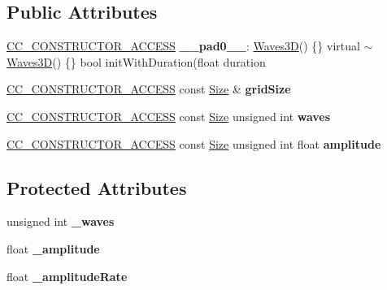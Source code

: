 \subsection*{Public Attributes}
\begin{DoxyCompactItemize}
\item 
\mbox{\label{classWaves3D_adcd03f1972d5d162163016145151eb41}} 
\hyperlink{_2cocos2d_2cocos_2base_2ccConfig_8h_a25ef1314f97c35a2ed3d029b0ead6da0}{C\+C\+\_\+\+C\+O\+N\+S\+T\+R\+U\+C\+T\+O\+R\+\_\+\+A\+C\+C\+E\+SS} {\bfseries \+\_\+\+\_\+pad0\+\_\+\+\_\+}\+: \hyperlink{classWaves3D}{Waves3D}() \{\} virtual $\sim$\hyperlink{classWaves3D}{Waves3D}() \{\} bool init\+With\+Duration(float duration
\item 
\mbox{\label{classWaves3D_afe0a73db4a6a48cc7da8ebac43cce0bc}} 
\hyperlink{_2cocos2d_2cocos_2base_2ccConfig_8h_a25ef1314f97c35a2ed3d029b0ead6da0}{C\+C\+\_\+\+C\+O\+N\+S\+T\+R\+U\+C\+T\+O\+R\+\_\+\+A\+C\+C\+E\+SS} const \hyperlink{classSize}{Size} \& {\bfseries grid\+Size}
\item 
\mbox{\label{classWaves3D_a63b2b655c34bf670639bf858bad4f186}} 
\hyperlink{_2cocos2d_2cocos_2base_2ccConfig_8h_a25ef1314f97c35a2ed3d029b0ead6da0}{C\+C\+\_\+\+C\+O\+N\+S\+T\+R\+U\+C\+T\+O\+R\+\_\+\+A\+C\+C\+E\+SS} const \hyperlink{classSize}{Size} unsigned int {\bfseries waves}
\item 
\mbox{\label{classWaves3D_ad6492842ea2093c7dc7b20662713861f}} 
\hyperlink{_2cocos2d_2cocos_2base_2ccConfig_8h_a25ef1314f97c35a2ed3d029b0ead6da0}{C\+C\+\_\+\+C\+O\+N\+S\+T\+R\+U\+C\+T\+O\+R\+\_\+\+A\+C\+C\+E\+SS} const \hyperlink{classSize}{Size} unsigned int float {\bfseries amplitude}
\end{DoxyCompactItemize}
\subsection*{Protected Attributes}
\begin{DoxyCompactItemize}
\item 
\mbox{\label{classWaves3D_a566bc7d08cd164c7291b8beaae892d5f}} 
unsigned int {\bfseries \+\_\+waves}
\item 
\mbox{\label{classWaves3D_aba1cd66297407f2b86eab8acdf5b0d66}} 
float {\bfseries \+\_\+amplitude}
\item 
\mbox{\label{classWaves3D_a7d0e3bc10382cb9eb0729576fbac04a0}} 
float {\bfseries \+\_\+amplitude\+Rate}
\end{DoxyCompactItemize}
